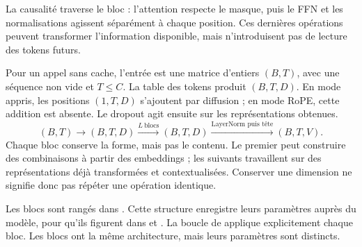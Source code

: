 La causalité traverse le bloc : l'attention respecte le masque, puis le FFN et les normalisations agissent séparément à chaque position. Ces dernières opérations peuvent transformer l'information disponible, mais n'introduisent pas de lecture des tokens futurs.






Pour un appel sans cache, l'entrée est une matrice d'entiers $(B,T)$, avec une séquence non vide et $T\leq C$. La table des tokens produit $(B,T,D)$. En mode appris, les positions $(1,T,D)$ s'ajoutent par diffusion ; en mode RoPE, cette addition est absente. Le dropout agit ensuite sur les représentations obtenues.
\[
 (B,T)\longrightarrow(B,T,D)
 \xrightarrow{L\ \text{blocs}}(B,T,D)
 \xrightarrow{\text{LayerNorm puis tête}}(B,T,V).
\]
Chaque bloc conserve la forme, mais pas le contenu. Le premier peut construire des combinaisons à partir des embeddings ; les suivants travaillent sur des représentations déjà transformées et contextualisées. Conserver une dimension ne signifie donc pas répéter une opération identique.

Les blocs sont rangés dans . Cette structure enregistre leurs paramètres auprès du modèle, pour qu'ils figurent dans  et . La boucle de  applique explicitement chaque bloc. Les blocs ont la même architecture, mais leurs paramètres sont distincts.

